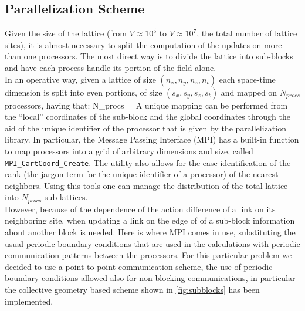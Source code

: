 \subsection{Parallelization Scheme}
\label{sec:para_gen}
Given the size of the lattice (from $V \approx 10^5$ to $V\approx 10^7$, the total number of lattice sites), it is almost necessary to split the computation of the updates on more than one processors. The most direct way is to divide the lattice into sub-blocks and have each process handle its portion of the field alone. \\
In an operative way, given a lattice of size $(n_x, n_y, n_z, n_t)$ each space-time dimension is split into even portions, of size $(s_x, s_y, s_z, s_t)$ and mapped on $N_{procs}$ processors, having that:
\beq
N_{procs} =  \times {} \times {}  \times {}
\eeq 
A unique mapping can be performed from the ``local'' coordinates of the sub-block and the global coordinates through the aid of the unique identifier of the processor that is given by the parallelization library. In particular, the Message Passing Interface (MPI) has a built-in function to map processors into a grid of arbitrary dimensions and size, called \texttt{MPI\_CartCoord\_Create}. The utility also allows for the ease identification of the rank (the jargon term for the unique identifier of a processor) of the nearest neighbors. Using this tools one can manage the distribution of the total lattice into $N_{procs}$ sub-lattices. \\
However, because of the dependence of the action difference of a link on its neighboring site, when updating a link on the edge of of a sub-block information about another block is needed. Here is where MPI comes in use, substituting the usual periodic boundary conditions that are used in the calculations with periodic communication patterns between the processors. For this particular problem we decided to use a point to point communication scheme, the use of periodic boundary conditions allowed also for non-blocking communications, in particular the collective geometry based scheme shown in \cref{fig:subblocks} has been implemented. 



